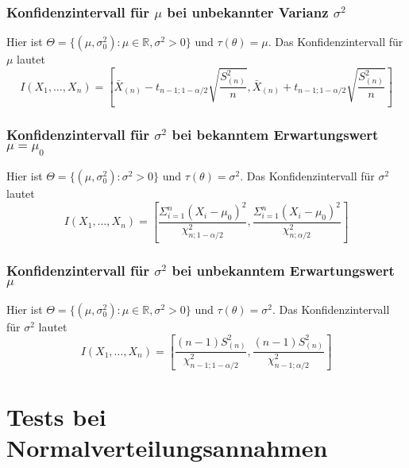 \documentclass[
	ngerman,
	accentcolor=9c,%
	type=intern,
	marginpar=false
	]{tudapub}
\begin{document}
                \subsubsection*{Konfidenzintervall für $\mu$ bei unbekannter Varianz $\sigma^2$}
                    Hier ist $\Theta = \{(\mu, \sigma^2_0):\mu \in \mathbb{R}, \sigma^2 > 0\}$ und $\tau(\theta) = \mu$. Das Konfidenzintervall für $\mu$ lautet
                    \begin{equation*}
                        I(X_1,\dots,X_n)=\left[\bar{X}_{(n)}-t_{n-1;1-\alpha/2}\sqrt{\dfrac{S^2_{(n)}}{n}},\bar{X}_{(n)}+t_{n-1;1-\alpha/2}\sqrt{\dfrac{S^2_{(n)}}{n}}\right]
                    \end{equation*}
                \subsubsection*{Konfidenzintervall für $\sigma^2$ bei bekanntem Erwartungswert $\mu = \mu_0$}
                    Hier ist $\Theta = \{(\mu, \sigma^2_0):\sigma^2 > 0\}$ und $\tau(\theta) = \sigma^2$. Das Konfidenzintervall für $\sigma^2$ lautet
                    \begin{equation*}
                        I(X_1,\dots,X_n)=\left[
                            \dfrac{\Sigma_{i=1}^n (X_i-\mu_0)^2}{\chi^2_{n;1-\alpha/2}}
                            ,
                            \dfrac{\Sigma_{i=1}^n (X_i-\mu_0)^2}{\chi^2_{n;\alpha/2}}
                        \right]
                    \end{equation*}
                \subsubsection*{Konfidenzintervall für $\sigma^2$ bei unbekanntem Erwartungswert $\mu$}
                    Hier ist $\Theta = \{(\mu, \sigma^2_0):\mu \in \mathbb{R},\sigma^2 > 0\}$ und $\tau(\theta) = \sigma^2$. Das Konfidenzintervall für $\sigma^2$ lautet
                    \begin{equation*}
                        I(X_1,\dots,X_n)=\left[
                            \dfrac{(n-1)S^2_{(n)}}{\chi^2_{n-1;1-\alpha/2}}
                            ,
                            \dfrac{(n-1)S^2_{(n)}}{\chi^2_{n-1;\alpha/2}}
                        \right]
                    \end{equation*}
                    \newpage
        \section{Tests bei Normalverteilungsannahmen}
\end{document}
